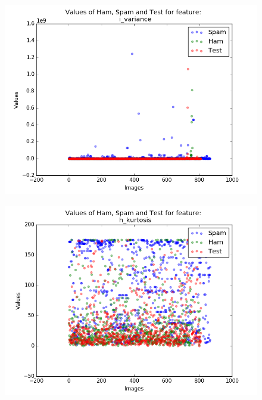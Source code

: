 \begin{figure}[h]
	\centering
	\begin{minipage}{.5\textwidth}
		\centering
		\includegraphics[width=\linewidth]{images/appA/i_variance_values_scatter}
		\label{fig:i_variance_values_scatter}
	\end{minipage}%
	\begin{minipage}{.5\textwidth}
		\centering
		\includegraphics[width=\linewidth]{images/appA/h_kurtosis_values_scatter}
		\label{fig:h_kurtosis_values_scatter}
	\end{minipage}
\end{figure}


